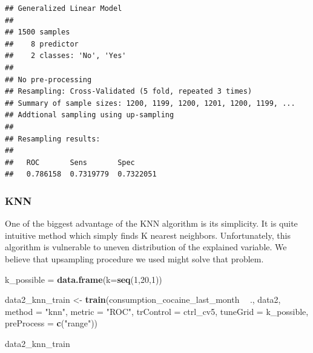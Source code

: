 \documentclass[
]{article}
\newenvironment{Shaded}{\begin{snugshade}}{\end{snugshade}}
\newcommand{\DataTypeTok}[1]{\textcolor[rgb]{0.13,0.29,0.53}{#1}}
\newcommand{\DecValTok}[1]{\textcolor[rgb]{0.00,0.00,0.81}{#1}}
\newcommand{\KeywordTok}[1]{\textcolor[rgb]{0.13,0.29,0.53}{\textbf{#1}}}
\newcommand{\NormalTok}[1]{#1}
\newcommand{\OperatorTok}[1]{\textcolor[rgb]{0.81,0.36,0.00}{\textbf{#1}}}
\newcommand{\StringTok}[1]{\textcolor[rgb]{0.31,0.60,0.02}{#1}}
\begin{document}
\begin{verbatim}
## Generalized Linear Model 
## 
## 1500 samples
##    8 predictor
##    2 classes: 'No', 'Yes' 
## 
## No pre-processing
## Resampling: Cross-Validated (5 fold, repeated 3 times) 
## Summary of sample sizes: 1200, 1199, 1200, 1201, 1200, 1199, ... 
## Addtional sampling using up-sampling
## 
## Resampling results:
## 
##   ROC       Sens       Spec     
##   0.786158  0.7319779  0.7322051
\end{verbatim}

\hypertarget{knn-1}{%
\subsubsection{KNN}\label{knn-1}}

One of the biggest advantage of the KNN algorithm is its simplicity. It
is quite intuitive method which simply finds K nearest neighbors.
Unfortunately, this algorithm is vulnerable to uneven distribution of
the explained variable. We believe that upsampling procedure we used
might solve that problem.

\begin{Shaded}
\begin{Highlighting}[]
\NormalTok{k_possible =}\StringTok{ }\KeywordTok{data.frame}\NormalTok{(}\DataTypeTok{k=}\KeywordTok{seq}\NormalTok{(}\DecValTok{1}\NormalTok{,}\DecValTok{20}\NormalTok{,}\DecValTok{1}\NormalTok{))}

\NormalTok{data2_knn_train <-}\StringTok{ }
\StringTok{  }\KeywordTok{train}\NormalTok{(consumption_cocaine_last_month }\OperatorTok{~}\StringTok{ }\NormalTok{.,}
\NormalTok{        data2,        }
        \DataTypeTok{method =} \StringTok{"knn"}\NormalTok{,}
        \DataTypeTok{metric =} \StringTok{"ROC"}\NormalTok{,}
        \DataTypeTok{trControl =}\NormalTok{ ctrl_cv5,}
        \DataTypeTok{tuneGrid =}\NormalTok{ k_possible,}
        \DataTypeTok{preProcess =} \KeywordTok{c}\NormalTok{(}\StringTok{"range"}\NormalTok{))}

\NormalTok{data2_knn_train}
\end{Highlighting}
\end{Shaded}
\end{document}
